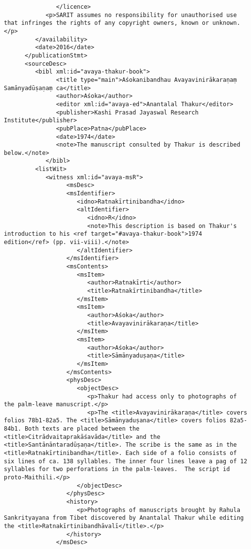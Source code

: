 \documentclass[article,12pt,a4paper]{memoir}%
\begin{document}
\begin{verbatim}
	           </licence>
            <p>SARIT assumes no responsibility for unauthorised use that infringes the rights of any copyright owners, known or unknown.</p>
         </availability>
         <date>2016</date>
      </publicationStmt>
      <sourceDesc>
         <bibl xml:id="avaya-thakur-book">
	           <title type="main">Aśokanibandhau Avayavinirākaraṇaṃ Samānyadūṣaṇaṃ ca</title>
	           <author>Aśoka</author>
	           <editor xml:id="avaya-ed">Anantalal Thakur</editor>
	           <publisher>Kashi Prasad Jayaswal Research Institute</publisher>
	           <pubPlace>Patna</pubPlace>
	           <date>1974</date>
	           <note>The manuscript consulted by Thakur is described below.</note>
	        </bibl>
         <listWit>
            <witness xml:id="avaya-msR">
	              <msDesc>
                  <msIdentifier>
                     <idno>Ratnakīrtinibandha</idno>
                     <altIdentifier>
                        <idno>R</idno>
                        <note>This description is based on Thakur's introduction to his <ref target="#avaya-thakur-book">1974 edition</ref> (pp. vii-viii).</note>
                     </altIdentifier>
                  </msIdentifier>
                  <msContents>
                     <msItem>
                        <author>Ratnakīrti</author>
                        <title>Ratnakīrtinibandha</title>
                     </msItem>
                     <msItem>
                        <author>Aśoka</author>
                        <title>Avayavinirākaraṇa</title>
                     </msItem>
                     <msItem>
                        <author>Aśoka</author>
                        <title>Sāmānyaduṣaṇa</title>
                     </msItem>
                  </msContents>
                  <physDesc>
                     <objectDesc>
                        <p>Thakur had access only to photographs of the palm-leave manuscript.</p>
                        <p>The <title>Avayavinirākaraṇa</title> covers folios 78b1-82a5. The <title>Sāmānyaduṣana</title> covers folios 82a5-84b1. Both texts are placed between the <title>Citrādvaitaprakāśavāda</title> and the <title>Santānāntaradūṣaṇa</title>. The scribe is the same as in the <title>Ratnakīrtinibandha</title>. Each side of a folio consists of six lines of ca. 138 syllables. The inner four lines leave a pag of 12 syllables for two perforations in the palm-leaves.  The script id proto-Maithili.</p>
                     </objectDesc>
                  </physDesc>
                  <history>
                     <p>Photographs of manuscripts brought by Rahula Sankrityayana from Tibet discovered by Anantalal Thakur while editing the <title>Ratnakīrtinibandhāvalī</title>.</p>
                  </history>
               </msDesc>


\end{verbatim}
\end{document}
